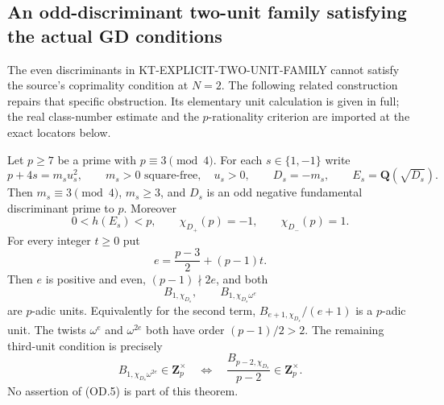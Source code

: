 \subsection{An odd-discriminant two-unit family satisfying the actual GD conditions}
\label{sec:kt-odd-discriminant-two-unit}

The even discriminants in KT-EXPLICIT-TWO-UNIT-FAMILY cannot satisfy
the source's coprimality condition at $N=2$.  The following related
construction repairs that specific obstruction.  Its elementary unit
calculation is given in full; the real class-number estimate and the
$p$-rationality criterion are imported at the exact locators below.

\begin{theorem}
Let $p\geq7$ be a prime with $p\equiv3\pmod4$.  For each
$s\in\{1,-1\}$ write
\[
 p+4s=m_su_s^2,\qquad m_s>0\text{ square-free},\quad u_s>0,
 \qquad D_s=-m_s,\qquad E_s=\mathbf Q(\sqrt{D_s}).       \tag{OD.1}
\]
Then $m_s\equiv3\pmod4$, $m_s\geq3$, and $D_s$ is an odd
negative fundamental discriminant prime to $p$.  Moreover
\[
 0<h(E_s)<p,\qquad
 \chi_{D_+}(p)=-1,\qquad \chi_{D_-}(p)=1.                \tag{OD.2}
\]
For every integer $t\geq0$ put
\[
 e=\frac{p-3}{2}+(p-1)t.                                \tag{OD.3}
\]
Then $e$ is positive and even, $(p-1)\nmid2e$, and both
\[
 B_{1,\chi_{D_s}},\qquad B_{1,\chi_{D_s}\omega^e}
                                                            \tag{OD.4}
\]
are $p$-adic units.  Equivalently for the second term,
$B_{e+1,\chi_{D_s}}/(e+1)$ is a $p$-adic unit.
The twists $\omega^e$ and $\omega^{2e}$ both have order
$(p-1)/2>2$.  The remaining third-unit condition is precisely
\[
 B_{1,\chi_{D_s}\omega^{2e}}\in\mathbf Z_p^\times
 \quad\Longleftrightarrow\quad
 \frac{B_{p-2,\chi_{D_s}}}{p-2}\in\mathbf Z_p^\times.     \tag{OD.5}
\]
No assertion of (OD.5) is part of this theorem.
\end{theorem}

